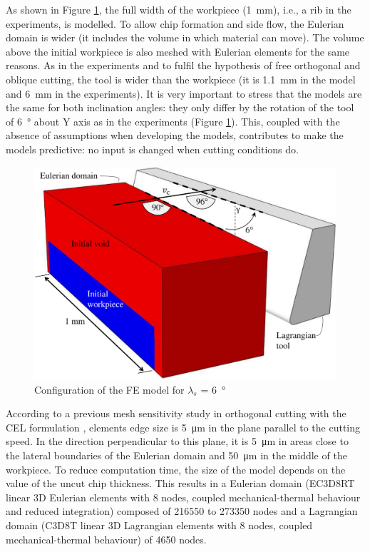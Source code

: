 \documentclass[preprint,12pt,times]{elsarticle}
\begin{document}
As shown in Figure \ref{fig:FEConfig}, the full width of the workpiece (\qty{1}{\mm}), i.e., a rib in the experiments, is modelled. To allow chip formation and side flow, the Eulerian domain is wider (it includes the volume in which material can move). The volume above the initial workpiece is also meshed with Eulerian elements for the same reasons. As in the experiments and to fulfil the hypothesis of free orthogonal and oblique cutting, the tool is wider than the workpiece (it is \qty{1.1}{\mm} in the model and \qty{6}{\mm} in the experiments). It is very important to stress that the models are the same for both inclination angles: they only differ by the rotation of the tool of \qty{6}{\degree} about Y axis as in the experiments (Figure \ref{fig:FEConfig}). This, coupled with the absence of assumptions when developing the models, contributes to make the models predictive: no input is changed when cutting conditions do.

\begin{figure}[!h]
\centering
\includegraphics[width = 140 mm]{Figures/FEConfig}
\caption{Configuration of the FE model for $\lambda_s$ = \qty{6}{\degree}}
\label{fig:FEConfig}
\end{figure}

According to a previous mesh sensitivity study in orthogonal cutting with the CEL formulation \cite{ducobu_Finite_2017}, elements edge size is \qty{5}{\um} in the plane parallel to the cutting speed. In the direction perpendicular to this plane, it is \qty{5}{\um} in areas close to the lateral boundaries of the Eulerian domain and \qty{50}{\um} in the middle of the workpiece. To reduce computation time, the size of the model depends on the value of the uncut chip thickness. This results in a Eulerian domain (EC3D8RT linear 3D Eulerian elements with 8 nodes, coupled mechanical-thermal behaviour and reduced integration) composed of \num{216550} to \num{273350} nodes and a Lagrangian domain (C3D8T linear 3D Lagrangian elements with 8 nodes, coupled mechanical-thermal behaviour) of \num{4650} nodes.
\end{document}
